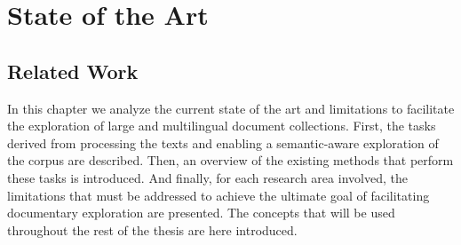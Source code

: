 

\chapter{State of the Art}\label{ch:soa}

\graphicspath{{soa/figures/}}


\section{Related Work}\label{sec:related-work}

In this chapter we analyze the current state of the art and limitations to facilitate the exploration of large and multilingual document collections. First, the tasks derived from processing the texts and enabling a semantic-aware exploration of the corpus are described. Then, an overview of the existing methods that perform these tasks is introduced. And finally, for each research area involved, the limitations that must be addressed to achieve the ultimate goal of facilitating documentary exploration are presented. The concepts that will be used throughout the rest of the thesis are here introduced. 

